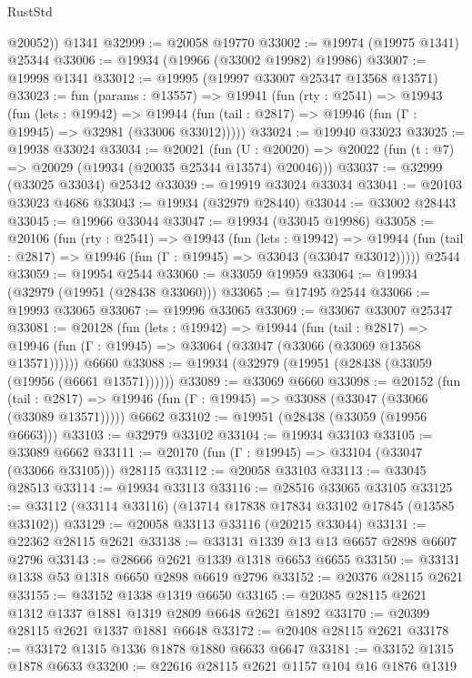 \begin{lexlean}{RustStd}
\begin{coremodule}
        @20052))
    @1341
@32999 := @20058 @19770
@33002 := @19974 (@19975 @1341) @25344
@33006 := @19934 (@19966 (@33002 @19982) @19986)
@33007 := @19998 @1341
@33012 := @19995 (@19997 @33007 @25347 @13568 @13571)
@33023 := fun (params : @13557) =>
  @19941
    (fun (rty : @2541) =>
    @19943
      (fun (lets : @19942) =>
      @19944 (fun (tail : @2817) => @19946 (fun (Γ : @19945) => @32981 (@33006 @33012)))))
@33024 := @19940 @33023
@33025 := @19938 @33024
@33034 := @20021
    (fun (U : @20020) => @20022 (fun (t : @7) => @20029 (@19934 (@20035 @25344 @13574) @20046)))
@33037 := @32999 (@33025 @33034) @25342
@33039 := @19919 @33024 @33034
@33041 := @20103 @33023 @4686
@33043 := @19934 (@32979 @28440)
@33044 := @33002 @28443
@33045 := @19966 @33044
@33047 := @19934 (@33045 @19986)
@33058 := @20106
    (fun (rty : @2541) =>
    @19943
      (fun (lets : @19942) =>
      @19944 (fun (tail : @2817) => @19946 (fun (Γ : @19945) => @33043 (@33047 @33012)))))
    @2544
@33059 := @19954 @2544
@33060 := @33059 @19959
@33064 := @19934 (@32979 (@19951 (@28438 @33060)))
@33065 := @17495 @2544
@33066 := @19993 @33065
@33067 := @19996 @33065
@33069 := @33067 @33007 @25347
@33081 := @20128
    (fun (lets : @19942) =>
    @19944
      (fun (tail : @2817) =>
      @19946 (fun (Γ : @19945) => @33064 (@33047 (@33066 (@33069 @13568 @13571))))))
    @6660
@33088 := @19934 (@32979 (@19951 (@28438 (@33059 (@19956 (@6661 @13571))))))
@33089 := @33069 @6660
@33098 := @20152
    (fun (tail : @2817) => @19946 (fun (Γ : @19945) => @33088 (@33047 (@33066 (@33089 @13571)))))
    @6662
@33102 := @19951 (@28438 (@33059 (@19956 @6663)))
@33103 := @32979 @33102
@33104 := @19934 @33103
@33105 := @33089 @6662
@33111 := @20170 (fun (Γ : @19945) => @33104 (@33047 (@33066 @33105))) @28115
@33112 := @20058 @33103
@33113 := @33045 @28513
@33114 := @19934 @33113
@33116 := @28516 @33065 @33105
@33125 := @33112 (@33114 @33116) (@13714 @17838 @17834 @33102 @17845 (@13585 @33102))
@33129 := @20058 @33113 @33116 (@20215 @33044)
@33131 := @22362 @28115 @2621
@33138 := @33131 @1339 @13 @13 @6657 @2898 @6607 @2796
@33143 := @28666 @2621 @1339 @1318 @6653 @6655
@33150 := @33131 @1338 @53 @1318 @6650 @2898 @6619 @2796
@33152 := @20376 @28115 @2621
@33155 := @33152 @1338 @1319 @6650
@33165 := @20385 @28115 @2621 @1312 @1337 @1881 @1319 @2809 @6648 @2621 @1892
@33170 := @20399 @28115 @2621 @1337 @1881 @6648
@33172 := @20408 @28115 @2621
@33178 := @33172 @1315 @1336 @1878 @1880 @6633 @6647
@33181 := @33152 @1315 @1878 @6633
@33200 := @22616
    @28115
    @2621
    @1157
    @104
    @16
    @1876
    @1319

\end{coremodule}
\end{lexlean}
